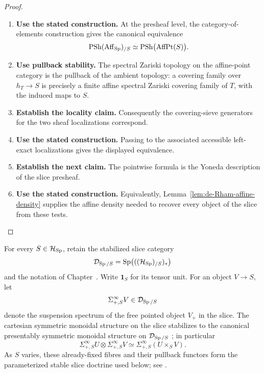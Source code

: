 \begin{proof}
\leavevmode
\begin{enumerate}[label=\textup{(\arabic*)}]
    \item \textbf{Use the stated construction.}
    At the presheaf level, the category-of-elements construction gives the canonical
    equivalence
    \[
    \operatorname{PSh}(\operatorname{Aff}_{\operatorname{Sp}})_{/S}
    \simeq
    \operatorname{PSh}\bigl(\operatorname{AffPt}(S)\bigr).
    \]
    \item \textbf{Use pullback stability.}
    The spectral Zariski topology on the affine-point category is the pullback of the
    ambient topology: a covering family over \(h_T\to S\) is precisely a finite affine
    spectral Zariski covering family of \(T\), with the induced maps to \(S\).
    \item \textbf{Establish the locality claim.}
    Consequently the covering-sieve generators for the two sheaf localizations
    correspond.
    \item \textbf{Use the stated construction.}
    Passing to the associated accessible left-exact localizations gives the
    displayed equivalence.
    \item \textbf{Establish the next claim.}
    The pointwise formula is the Yoneda description of the
    slice presheaf.
    \item \textbf{Use the stated construction.}
    Equivalently,
    Lemma~\ref{lem:de-Rham-affine-density} supplies the affine density needed to recover
    every object of the slice from these tests.
\end{enumerate}
\end{proof}

\begin{construction}
\label{def:parameterized-stable-coefficient-categories}
For every \(S\in\mathcal H_{\operatorname{Sp}}\), retain the stabilized slice category
\[
  \mathcal D_{\operatorname{Sp}/S}
  =
  \operatorname{Sp}\bigl(((\mathcal H_{\operatorname{Sp}})_{/S})_*\bigr)
\]
and the notation of Chapter~.
Write \(\mathbf1_S\) for its tensor unit. For an object \(V\to S\), let
\[
  \Sigma^\infty_{+,S}V\in\mathcal D_{\operatorname{Sp}/S}
\]
denote the suspension spectrum of the free pointed object \(V_+\) in the slice.
The cartesian symmetric monoidal structure on the slice stabilizes to the canonical
presentably symmetric monoidal structure on \(\mathcal D_{\operatorname{Sp}/S}\) \cite{LurieHigherAlgebra}; in particular
\[
  \Sigma^\infty_{+,S}U\otimes\Sigma^\infty_{+,S}V
  \simeq
  \Sigma^\infty_{+,S}(U\times_SV).
\]
As \(S\) varies, these already-fixed fibres and their pullback functors form the
parameterized stable slice doctrine used below; see \cite{LurieHigherAlgebra}.
\end{construction}

